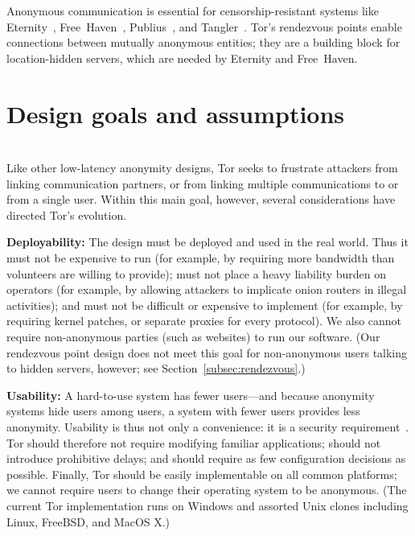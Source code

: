 \documentclass[twocolumn]{article}
\begin{document}
Anonymous communication is essential for censorship-resistant
systems like Eternity~\cite{eternity}, Free~Haven~\cite{freehaven-berk},
Publius~\cite{publius}, and Tangler~\cite{tangler}. Tor's rendezvous
points enable connections between mutually anonymous entities; they
are a building block for location-hidden servers, which are needed by
Eternity and Free~Haven.


\section{Design goals and assumptions}
\label{sec:assumptions}

\\
Like other low-latency anonymity designs, Tor seeks to frustrate
attackers from linking communication partners, or from linking
multiple communications to or from a single user.  Within this
main goal, however, several considerations have directed
Tor's evolution.

\textbf{Deployability:} The design must be deployed and used in the
real world.  Thus it
must not be expensive to run (for example, by requiring more bandwidth
than volunteers are willing to provide); must not place a heavy
liability burden on operators (for example, by allowing attackers to
implicate onion routers in illegal activities); and must not be
difficult or expensive to implement (for example, by requiring kernel
patches, or separate proxies for every protocol).  We also cannot
require non-anonymous parties (such as websites)
to run our software.  (Our rendezvous point design does not meet
this goal for non-anonymous users talking to hidden servers,
however; see Section~\ref{subsec:rendezvous}.)

\textbf{Usability:} A hard-to-use system has fewer users---and because
anonymity systems hide users among users, a system with fewer users
provides less anonymity.  Usability is thus not only a convenience:
it is a security requirement~\cite{econymics,back01}. Tor should
therefore not
require modifying familiar applications; should not introduce prohibitive
delays;
and should require as few configuration decisions
as possible.  Finally, Tor should be easily implementable on all common
platforms; we cannot require users to change their operating system
to be anonymous.  (The current Tor implementation runs on Windows and
assorted Unix clones including Linux, FreeBSD, and MacOS X.)
\end{document}

